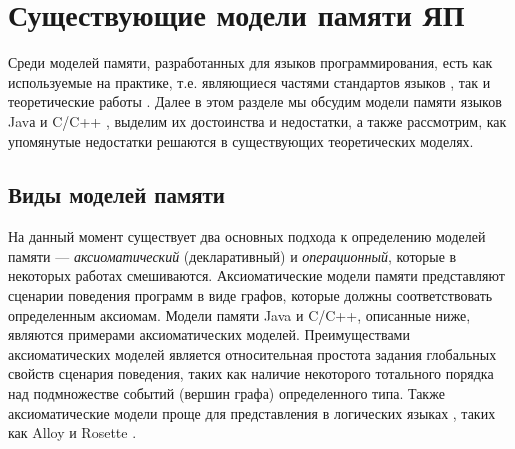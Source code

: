 





\section{Существующие модели памяти ЯП}
Среди моделей памяти, разработанных для языков программирования, есть как используемые на практике,
т.е. являющиеся частями стандартов языков \cite{Gosling-al:BOOK96,JavaStandard,C:11,CPP:11}, так и теоретические работы
\cite{Crary-Sullivan:POPL15,Lamport:TC79,Boudol-al:EXPRESS12,Boudol-Petri:POPL09,PichonPharabod-Sewell:POPL16,Jeffrey-Riely:LICS16}.
Далее в этом разделе мы обсудим модели памяти языков Javа \cite{JavaStandard} и C/C++ \cite{C:11,CPP:11},
выделим их достоинства и недостатки, а также рассмотрим, как упомянутые недостатки решаются в существующих
теоретических моделях.

\subsection{Виды моделей памяти}
На данный момент существует два основных подхода к определению моделей памяти ---
\emph{аксиоматический} (декларативный) и \emph{операционный}, которые в некоторых работах смешиваются.
Аксиоматические модели памяти представляют сценарии поведения программ в виде графов, которые
должны соответствовать определенным аксиомам.
Модели памяти Java и C/C++, описанные ниже, являются примерами аксиоматических моделей.
Преимуществами аксиоматических моделей является относительная простота задания глобальных
свойств сценария поведения, таких как наличие некоторого тотального порядка над подмножестве событий (вершин графа)
определенного типа.
Также аксиоматические модели проще для представления в логических языках \cite{Wickerson-al:POPL17,Bornholt-Torlak:PLDI17},
таких как Alloy \cite{Jackson:Book06} и Rosette \cite{Torlak-Bodik:Onward13,Torlak-Bodik:PLDI14}.

